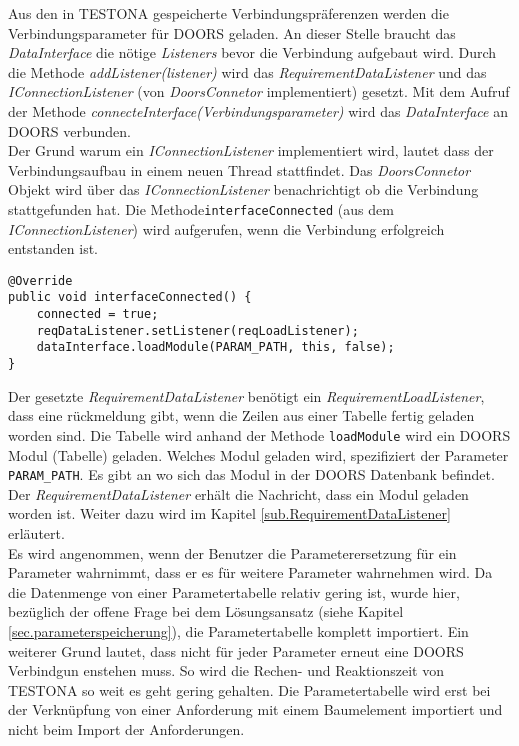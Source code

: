 Aus den in TESTONA gespeicherte Verbindungspräferenzen werden die Verbindungsparameter für DOORS geladen. An dieser Stelle braucht das \textit{DataInterface} die nötige \textit{Listeners} bevor die Verbindung aufgebaut wird. Durch die Methode \textit{addListener(listener)} wird das \textit{RequirementDataListener} und das \textit{IConnectionListener} (von \textit{DoorsConnetor} implementiert) gesetzt. Mit dem Aufruf der Methode \textit{connecteInterface(Verbindungsparameter)} wird das \textit{DataInterface} an DOORS verbunden.\\

Der Grund warum ein \textit{IConnectionListener} implementiert wird, lautet dass der Verbindungsaufbau in einem neuen Thread stattfindet. Das \textit{DoorsConnetor} Objekt wird über das \textit{IConnectionListener} benachrichtigt ob die Verbindung stattgefunden hat. Die Methode\texttt{interfaceConnected} (aus dem \textit{IConnectionListener}) wird aufgerufen, wenn die Verbindung erfolgreich entstanden ist.

\begin{lstlisting}[caption={Verbindungsaufbau was erfolgreich}, captionpos=b]
@Override
public void interfaceConnected() {
	connected = true;
	reqDataListener.setListener(reqLoadListener);
	dataInterface.loadModule(PARAM_PATH, this, false);
}
\end{lstlisting}

Der gesetzte \textit{RequirementDataListener} benötigt ein \textit{RequirementLoadListener}, dass eine rückmeldung gibt, wenn die Zeilen aus einer Tabelle fertig geladen worden sind. Die Tabelle wird anhand der Methode \texttt{loadModule} wird ein DOORS Modul (Tabelle) geladen. Welches Modul geladen wird, spezifiziert der Parameter \texttt{PARAM\_PATH}. Es gibt an wo sich das Modul in der DOORS Datenbank befindet. Der \textit{RequirementDataListener} erhält die Nachricht, dass ein Modul geladen worden ist. Weiter dazu wird im Kapitel \ref{sub.RequirementDataListener} erläutert.\\


Es wird angenommen, wenn der Benutzer die Parameterersetzung für ein Parameter wahrnimmt, dass er es für weitere Parameter wahrnehmen wird. Da die Datenmenge von einer Parametertabelle relativ gering ist, wurde hier, bezüglich der offene Frage bei dem Lösungsansatz (siehe Kapitel \ref{sec.parameterspeicherung}), die Parametertabelle komplett importiert. 
Ein weiterer Grund lautet, dass nicht für jeder Parameter erneut eine DOORS Verbindgun enstehen muss. So wird die Rechen- und Reaktionszeit von TESTONA so weit es geht gering gehalten. Die Parametertabelle wird erst bei der Verknüpfung von einer Anforderung mit einem Baumelement importiert und nicht beim Import der Anforderungen. 

